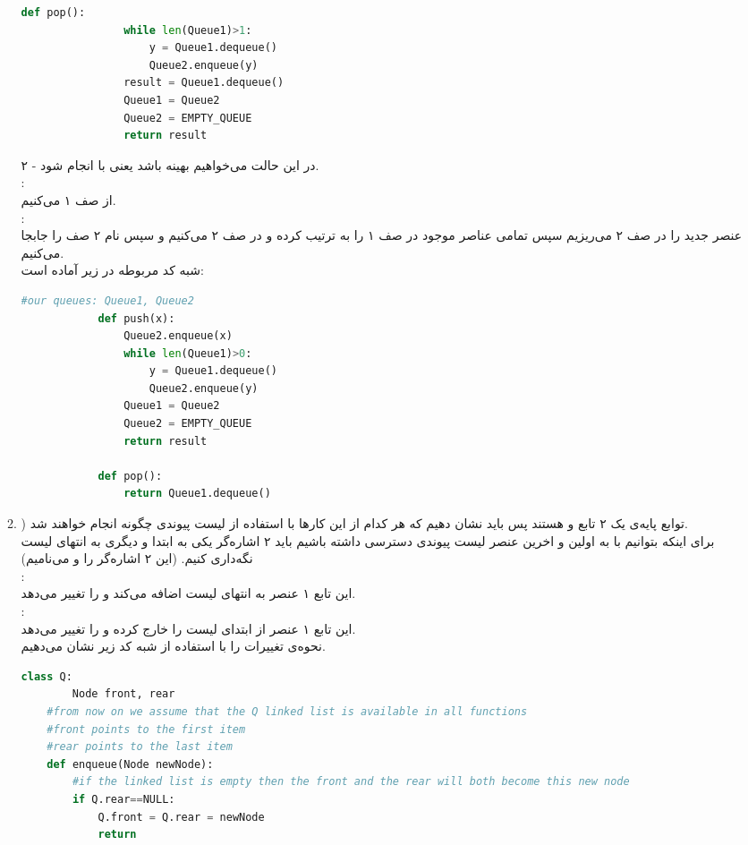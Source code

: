 \documentclass{article}
\begin{document}
\begin{enumerate}
\begin{enumerate}
\begin{latin}
\begin{flushright}
\begin{lstlisting}[language=Python]
			def pop():
				while len(Queue1)>1:
					y = Queue1.dequeue()
					Queue2.enqueue(y)
				result = Queue1.dequeue()
				Queue1 = Queue2
				Queue2 = EMPTY_QUEUE
				return result
			\end{lstlisting}
			\end{flushright}								
			\end{latin}
			۲ - در این حالت می‌خواهیم  بهینه باشد یعنی با  انجام شود.\\
			:\\
			از صف ۱  می‌کنیم. \\
			: \\
			عنصر جدید را در صف ۲ می‌ریزیم سپس تمامی عناصر موجود در صف ۱ را به ترتیب  کرده و در صف ۲   می‌کنیم و سپس نام ۲ صف را جابجا می‌کنیم.\\ 
			شبه کد مربوطه در زیر آماده است:
			\begin{latin}
			\begin{flushright}				
			\begin{lstlisting}[language=Python]
			#our queues: Queue1, Queue2
			def push(x):
				Queue2.enqueue(x)
				while len(Queue1)>0:
					y = Queue1.dequeue()
					Queue2.enqueue(y)
				Queue1 = Queue2
				Queue2 = EMPTY_QUEUE
				return result

			def pop():
				return Queue1.dequeue()
			\end{lstlisting}
			\end{flushright}								
			\end{latin}
			\item)  توابع پایه‌ی یک  ۲ تابع  و  هستند پس باید نشان دهیم که هر کدام از این کار‌ها با استفاده از لیست پیوندی چگونه انجام خواهند شد.\\
			برای اینکه بتوانیم با  به اولین و اخرین عنصر لیست پیوندی دسترسی داشته باشیم باید ۲ اشاره‌گر یکی به ابتدا و دیگری به انتهای لیست نگه‌داری کنیم. (این ۲ اشاره‌گر را  و  می‌نامیم)\\
			:\\
			این تابع ۱ عنصر به انتهای لیست اضافه می‌کند و  را تغییر می‌دهد. \\
			:\\
			این تابع ۱ عنصر از ابتدا‌ی لیست را خارج کرده و  را تغییر می‌دهد.\\
			نحوه‌ی تغییرات را با استفاده از شبه کد زیر نشان می‌دهیم. 
	\begin{latin}
	\begin{flushright}				
	\begin{lstlisting}[language=Python]
	class Q:
		Node front, rear
	#from now on we assume that the Q linked list is available in all functions
	#front points to the first item
	#rear points to the last item
	def enqueue(Node newNode):
		#if the linked list is empty then the front and the rear will both become this new node
		if Q.rear==NULL:
			Q.front = Q.rear = newNode
			return


\end{lstlisting}
\end{flushright}
\end{latin}
\end{enumerate}
\end{enumerate}
\end{document}

